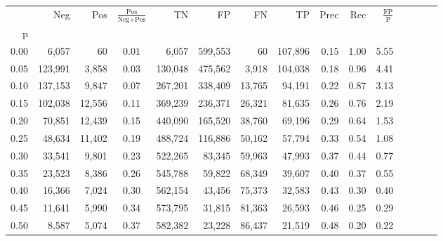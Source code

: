 \begin{tabular}{rrrcrrrrrrrrrrr}
\toprule
{} &      Neg &     Pos & $\frac{\text{Pos}}{\text{Neg}+\text{Pos}}$ &       TN &       FP &       FN &       TP &  Prec &   Rec & $\frac{\text{FP}}{\text{P}}$ \\
p    &          &         &                                            &          &          &          &          &       &       &                              \\
\midrule
0.00 &    6,057 &      60 &                                       0.01 &    6,057 &  599,553 &       60 &  107,896 &  0.15 &  1.00 &                         5.55 \\
0.05 &  123,991 &   3,858 &                                       0.03 &  130,048 &  475,562 &    3,918 &  104,038 &  0.18 &  0.96 &                         4.41 \\
0.10 &  137,153 &   9,847 &                                       0.07 &  267,201 &  338,409 &   13,765 &   94,191 &  0.22 &  0.87 &                         3.13 \\
0.15 &  102,038 &  12,556 &                                       0.11 &  369,239 &  236,371 &   26,321 &   81,635 &  0.26 &  0.76 &                         2.19 \\
0.20 &   70,851 &  12,439 &                                       0.15 &  440,090 &  165,520 &   38,760 &   69,196 &  0.29 &  0.64 &                         1.53 \\
0.25 &   48,634 &  11,402 &                                       0.19 &  488,724 &  116,886 &   50,162 &   57,794 &  0.33 &  0.54 &                         1.08 \\
0.30 &   33,541 &   9,801 &                                       0.23 &  522,265 &   83,345 &   59,963 &   47,993 &  0.37 &  0.44 &                         0.77 \\
0.35 &   23,523 &   8,386 &                                       0.26 &  545,788 &   59,822 &   68,349 &   39,607 &  0.40 &  0.37 &                         0.55 \\
0.40 &   16,366 &   7,024 &                                       0.30 &  562,154 &   43,456 &   75,373 &   32,583 &  0.43 &  0.30 &                         0.40 \\
0.45 &   11,641 &   5,990 &                                       0.34 &  573,795 &   31,815 &   81,363 &   26,593 &  0.46 &  0.25 &                         0.29 \\
0.50 &    8,587 &   5,074 &                                       0.37 &  582,382 &   23,228 &   86,437 &   21,519 &  0.48 &  0.20 &                         0.22 \\

\end{tabular}
